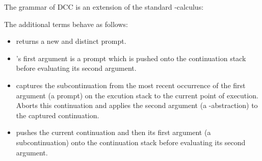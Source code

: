 The grammar of DCC is an extension of the standard \lam-calculus:

\begin{figure}[!h]
\end{figure}

The additional terms behave as follows:
\begin{itemize}
\item {} returns a new and distinct prompt.
\item {}'s first argument is a prompt which is pushed onto the continuation stack before evaluating its second argument. 
\item {} captures the subcontinuation from the most recent occurrence of the first argument (a prompt) on the excution stack to the current point of execution. Aborts this continuation and applies the second argument (a \lam-abstraction) to the captured continuation.
\item {} pushes the current continuation and then its first argument (a subcontinuation) onto the continuation stack before evaluating its second argument.
\end{itemize}
